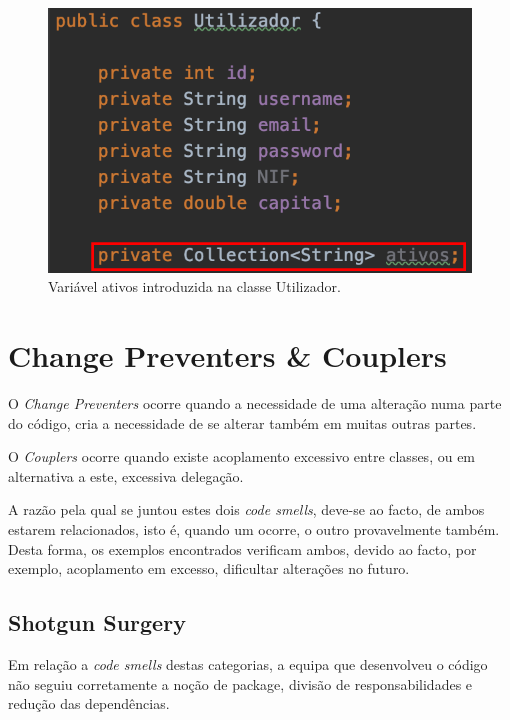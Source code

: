 \begin{figure}[H]
	\centering
	\includegraphics[scale=0.40]{images/POO_abuser_after_1.png}
	\caption{Variável ativos introduzida na classe Utilizador.}
	\label{img:pag4}
\end{figure}

\newpage
\section{Change Preventers \& Couplers}
\hspace{5mm} O \emph{Change Preventers} ocorre quando a necessidade de uma alteração numa parte do código, cria a necessidade de se alterar também em muitas outras partes.

\hspace{5mm} O \emph{Couplers} ocorre quando existe acoplamento excessivo entre classes, ou em alternativa a este, excessiva delegação.

\hspace{5mm} A razão pela qual se juntou estes dois \emph{code smells}, deve-se ao facto, de ambos estarem relacionados, isto é, quando um ocorre, o outro provavelmente também. Desta forma, os exemplos encontrados verificam ambos, devido ao facto, por exemplo, acoplamento em excesso, dificultar alterações no futuro.

\subsection{Shotgun Surgery}

\hspace{5mm} Em relação a \emph{code smells} destas categorias, a equipa que desenvolveu o código não seguiu corretamente a noção de package, divisão de responsabilidades e redução das dependências. 

